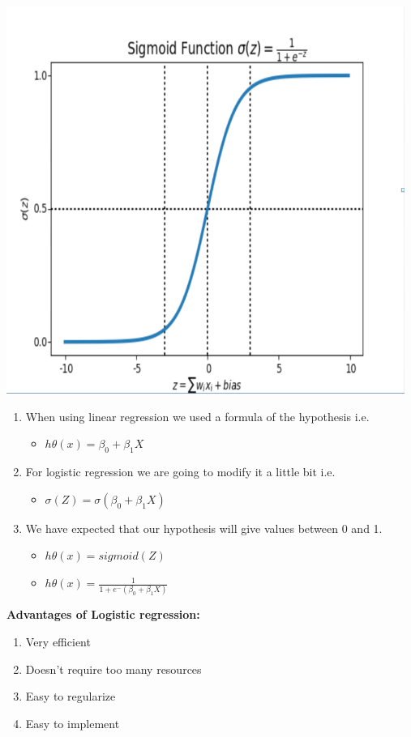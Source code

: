 \documentclass[a4paper, 11pt, oneside]{article} %
\begin{document}
\begin {enumerate}
\includegraphics[width=13cm, height=8 cm]{figures/Sigmoid}



\begin{enumerate}
\item When using linear regression we used a formula of the hypothesis i.e.
\begin{itemize}
\item $h{\theta(x)} = \beta_ {0}  + \beta_{1} X$
\end{itemize}
\item For logistic regression we are going to modify it a little bit i.e.
\begin {itemize}
\item $\sigma(Z) = \sigma(\beta_{0} +\beta_{1}X)$
\end{itemize}

\item We have expected that our hypothesis will give values between 0 and 1.
\begin{itemize}

\item $h{\theta(x)} = sigmoid(Z)$
\item $h{\theta(x)} = \frac {1}{1 + e ^- { (\beta_{0}+ \beta_{1}X)}}$
\end{itemize}
\end{enumerate}

 \textbf {Advantages of Logistic regression:  }   
\begin{enumerate}
\item Very efficient
\item Doesn’t require too many resources
\item Easy to regularize
\item Easy to implement
\end{enumerate}
\end{enumerate}
\end{document}
